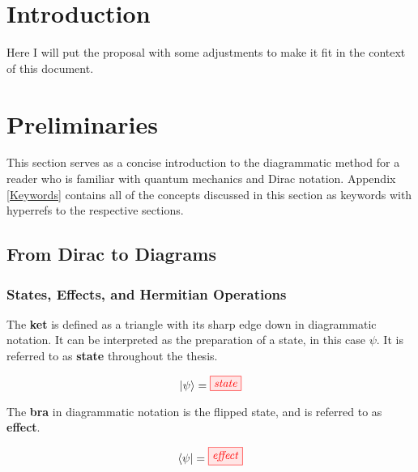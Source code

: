 \documentclass[]{article}
\title{}
\author{}
\begin{document}
\maketitle

\begin{abstract}

\end{abstract}

\section{Introduction}

Here I will put the proposal with some adjustments to make it fit in the context of this document.

\section{Preliminaries}

This section serves as a concise introduction to the diagrammatic method for a reader who is familiar with quantum mechanics and Dirac notation. Appendix \ref{Keywords} contains all of the concepts discussed in this section as keywords with hyperrefs to the respective sections.

\subsection{From Dirac to Diagrams}

\subsubsection{States, Effects, and Hermitian Operations}

\label{braandket}
The \textbf{ket} is defined as a triangle with its sharp edge down in diagrammatic notation. It can be interpreted as the preparation of a state, in this case $\psi$. It is referred to as \textbf{state} throughout the thesis.

\begin{equation}
\ket{\psi} =  \tikzfig{state}
\end{equation}

The \textbf{bra} in diagrammatic notation is the flipped state, and is referred to as \textbf{effect}. 

\begin{equation}
\bra{\psi} =  \tikzfig{effect}
\end{equation}
\end{document}
